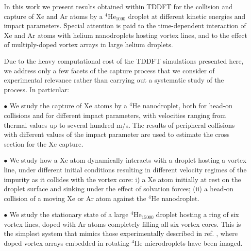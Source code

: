 In this work we present results obtained within TDDFT 
for the collision and capture of Xe and Ar atoms by a $^4$He$_{1000}$ 
droplet at different kinetic energies and impact parameters. Special attention is paid 
to the  time-dependent interaction of Xe and Ar atoms with 
helium nanodroplets hosting 
vortex lines, and to the effect of multiply-doped vortex arrays in large helium droplets.

Due to the heavy computational cost 
of the TDDFT simulations presented here, 
we  address only a few facets of the capture 
process that we consider of experimental relevance
rather than carrying out a systematic study of the process. In particular:

$\bullet$ We study the capture of Xe atoms by a $^4$He nanodroplet, both for head-on 
collisions and for different impact parameters,
with velocities ranging from thermal values up to several hundred m/s.
The results of peripheral collisions  
with different values of the impact parameter 
are used to estimate the cross section for the
Xe capture.
 
$\bullet$ We study how a Xe atom dynamically interacts with a 
droplet hosting a vortex line, under different initial conditions
resulting in different velocity regimes of the impurity as it 
collides with the vortex core:
i) a Xe atom initially at rest on the droplet surface and
sinking under the effect of solvation forces;
(ii) a head-on collision of a moving Xe or Ar atom  against the
$^4$He nanodroplet.

$\bullet$ We study the stationary state of 
a large $^4$He$_{15000}$ 
droplet hosting a ring of six vortex lines, doped with 
Ar atoms completely filling all six vortex cores. This is the simplest system that mimics those
experimentally described in ref. \cite{Gom14}, where 
doped vortex arrays embedded in rotating $^4$He microdroplets have been imaged.
 


